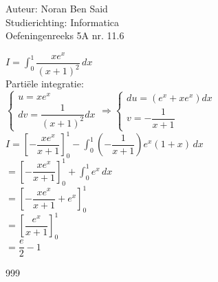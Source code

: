 \documentclass[a4paper]{article}
\begin{document}
  
\noindent \large Auteur: Noran Ben Said \\
\noindent \large Studierichting: Informatica\\
\noindent \large Oefeningenreeks 5A nr. 11.6 \\
\medskip

\normalsize

$ I = \displaystyle\int_0^1 \dfrac{xe^x}{(x+1)^2}\,dx$\\

Partiële integratie:\\

$\left\{ \begin{array}{l} 
    u = xe^x \\ 
    dv = \dfrac{1}{(x+1)^2}dx 
\end{array} \right. 
\Rightarrow 
\left\{ \begin{array}{l} 
    du = (e^x+xe^x)dx \\ 
    v = -\dfrac{1}{x+1} 
\end{array} \right.$\\

$ I = \left[ -\dfrac{xe^x}{x+1} \right]_0^1 - \displaystyle\int_0^1 \left( -\dfrac{1}{x+1} \right)e^x(1+x)\,dx$\\

$ = \left[ -\dfrac{xe^x}{x+1} \right]_0^1 + \displaystyle\int_0^1 e^x\,dx$\\

$ = \left[ -\dfrac{xe^x}{x+1} + e^x \right]_0^1$\\

$ = \left[ \dfrac{e^x}{x+1} \right]_0^1$\\

$ = \dfrac{e}{2} - 1$\\


\begin{thebibliography}{999}
\end{thebibliography}
\end{document}
